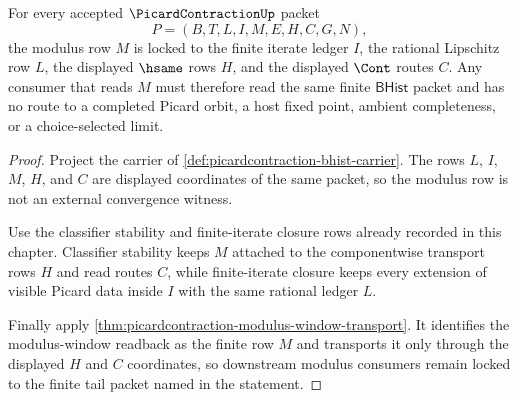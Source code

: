 \begin{theorem}
\label{thm:picardcontraction-modulus-row-finite-tail-lock}
For every accepted $\PicardContractionUp$ packet
$$
P=(B,T,L,I,M,E,H,C,G,N),
$$
the modulus row $M$ is locked to the finite iterate ledger $I$, the rational Lipschitz row $L$, the displayed $\hsame$ rows $H$, and the displayed $\Cont$ routes $C$. Any consumer that reads $M$ must therefore read the same finite $\mathsf{BHist}$ packet and has no route to a completed Picard orbit, a host fixed point, ambient completeness, or a choice-selected limit.
\end{theorem}
\begin{proof}
Project the carrier of \autoref{def:picardcontraction-bhist-carrier}. The rows $L$, $I$, $M$, $H$, and $C$ are displayed coordinates of the same packet, so the modulus row is not an external convergence witness.

Use the classifier stability and finite-iterate closure rows already recorded in this chapter. Classifier stability keeps $M$ attached to the componentwise transport rows $H$ and read routes $C$, while finite-iterate closure keeps every extension of visible Picard data inside $I$ with the same rational ledger $L$.

Finally apply \autoref{thm:picardcontraction-modulus-window-transport}. It identifies the modulus-window readback as the finite row $M$ and transports it only through the displayed $H$ and $C$ coordinates, so downstream modulus consumers remain locked to the finite tail packet named in the statement.
\end{proof}

